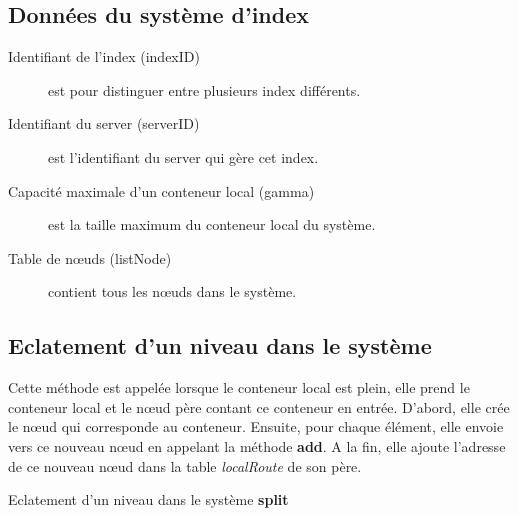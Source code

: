 \documentclass[a4paper,11pt]{report}
\begin{document}
\subsection{Données du système d'index}	
\begin{description}
	\item[Identifiant de l'index (indexID)] est pour distinguer entre plusieurs index différents.
	\item[Identifiant du server (serverID)] est l'identifiant du server qui gère cet index.
	\item[Capacité maximale d'un conteneur local (gamma)] est la taille maximum du conteneur local du système.
	\item[Table de nœuds (listNode)] contient tous les nœuds dans le système.
\end{description}		
	
	
\subsection{Eclatement d'un niveau dans le système}
	Cette méthode est appelée lorsque le conteneur local est plein, elle prend le conteneur local et le nœud père contant ce conteneur en entrée.
	D'abord, elle crée le nœud qui corresponde au conteneur. Ensuite, pour chaque élément, elle envoie vers ce nouveau nœud en appelant la méthode \textbf{add}. A la fin, elle ajoute l'adresse de ce nouveau nœud dans la table \textit{localRoute} de son père.
	
\begin{algorithme}
	Eclatement d'un niveau dans le système \textbf{split}
\end{algorithme}
\end{document}
